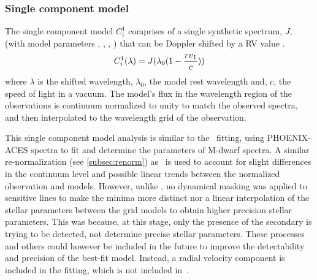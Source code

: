 \subsubsection{Single component model}
\label{subsubsec:single-model}
The single component model \(C^{1}_{i}\) comprises of a single synthetic spectrum, \(J\), (with model parameters \Teff{}, \logg{}, \feh{}, \alphafe{}) \alphafe{} that can be Doppler shifted by a {RV} value \Rvone{}.
\begin{equation}
C^{1}_{i}(\lambda) = J{}(\lambda_{0}(1-\frac{{rv{}}_{1}}{c}))
\end{equation}
where \(\lambda\) is the shifted wavelength, \(\lambda_{0}\), the model rest wavelength and, \(c\), the speed of light in a vacuum.
The model's flux in the wavelength region of the observations is continuum normalized to unity to match the observed spectra, and then interpolated to the wavelength grid of the observation.

This single component model analysis is similar to the~\citet{passegger_fundamental_2016} \textchisquared{} fitting, using PHOENIX-ACES spectra to fit and determine the parameters of M-dwarf spectra.
A similar re-normalization (see \cref{subsec:renorm}) as~\citet{passegger_fundamental_2016} is used to account for slight differences in the continuum level and possible linear trends between the normalized observation and models.
However, unlike \citet{passegger_fundamental_2016}, no dynamical masking was applied to sensitive lines to make the \textchisquared{} minima more distinct nor a linear interpolation of the stellar parameters between the grid models to obtain higher precision stellar parameters.
This was because, at this stage, only the presence of the secondary is trying to be detected, not determine precise stellar parameters.
These processes and others could however be included in the future to improve the detectability and precision of the best-fit model.
Instead, a radial velocity component is included in the \textchisquared{} fitting, which is not included in~\citet{passegger_fundamental_2016}.


